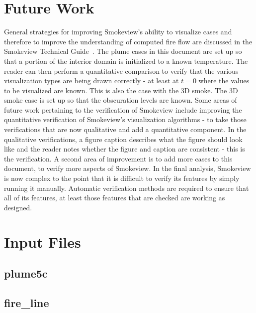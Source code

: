 \documentclass[11pt,twoside]{book}
\newcommand{\fdsinput}[1]{
{
\scriptsize

}
}
\begin{document}
\chapter{Future Work}
General strategies for improving Smokeview's ability to visualize cases and therefore to improve the understanding of computed fire flow are discussed in the Smokeview Technical Guide~\cite{Smokeview_Verification_Guide_5}.   The plume cases in this document are set up so that a portion of the interior domain is initialized to a known temperature.  The reader can then perform a quantitative comparison to verify that the various visualization types are being drawn correctly - at least at $t=0$ where the values to be visualized are known.  This is also the case with the 3D smoke.  The 3D smoke case is set up so that the obscuration levels are known.
Some areas of future work pertaining to the verification of Smokeview include improving the quantitative verification of Smokeview's visualization algorithms - to take those verifications that are now qualitative and add a quantitative component.  In the qualitative verifications, a figure caption describes what the figure should look like and the reader notes whether the figure and caption are consistent - this is the verification.  A second area of improvement is to add more cases to this document, to verify more aspects of Smokeview.  In the final analysis, Smokeview is now complex to the point that it is difficult to verify its features by simply running it manually.  Automatic verification methods are required to ensure that all of its features, at least those features that are checked are working as designed.





\appendix
{}

\chapter{Input Files}
\label{fdsinputfiles}
\section{plume5c}
\label{FDSplume5c}
\fdsinput{plume5c.fds}

\section{fire\_line}
\label{FDSfireline}
\fdsinput{../Wui/fire_line.fds}
\end{document}
